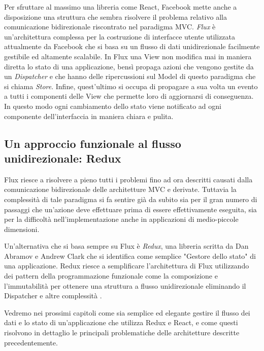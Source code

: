 Per sfruttare al massimo una libreria come React, Facebook mette anche a disposizione una struttura che sembra risolvere il problema relativo alla comunicazione bidirezionale riscontrato nel paradigma MVC. \textit{Flux} è un'architettura complessa per la costruzione di interfacce utente utilizzata attualmente da Facebook che si basa su un flusso di dati unidirezionale facilmente gestibile ed altamente scalabile. In Flux una View non modifica mai in maniera diretta lo stato di una applicazione, bensì propaga azioni che vengono gestite da un \textit{Dispatcher} e che hanno delle ripercussioni sul Model di questo paradigma che si chiama \textit{Store}. Infine, quest'ultimo si occupa di propagare a sua volta un evento a tutti i componenti delle View che permette loro di aggiornarsi di conseguenza. In questo modo ogni cambiamento dello stato viene notificato ad ogni componente dell'interfaccia in maniera chiara e pulita.

\subsection{Un approccio funzionale al flusso unidirezionale: Redux}
Flux riesce a risolvere a pieno tutti i problemi fino ad ora descritti causati dalla comunicazione bidirezionale delle architetture MVC e derivate. Tuttavia la complessità di tale paradigma si fa sentire già da subito sia per il gran numero di passaggi che un'azione deve effettuare prima di essere effettivamente eseguita, sia per la difficoltà nell'implementazione anche in applicazioni di medio-piccole dimensioni.

Un'alternativa che si basa sempre su Flux è \textit{Redux}, una libreria scritta da Dan Abramov e Andrew Clark che si identifica come semplice "Gestore dello stato" di una applicazione. Redux riesce a semplificare l'architettura di Flux utilizzando dei pattern della programmazione funzionale come la composizione e l'immutabilità per ottenere una struttura a flusso unidirezionale eliminando il Dispatcher e altre complessità \cite{AbramovOnReduxVsFlux}.

Vedremo nei prossimi capitoli come sia semplice ed elegante gestire il flusso dei dati e lo stato di un'applicazione che utilizza Redux e React, e come questi risolvono in dettaglio le principali problematiche delle architetture descritte precedentemente.
